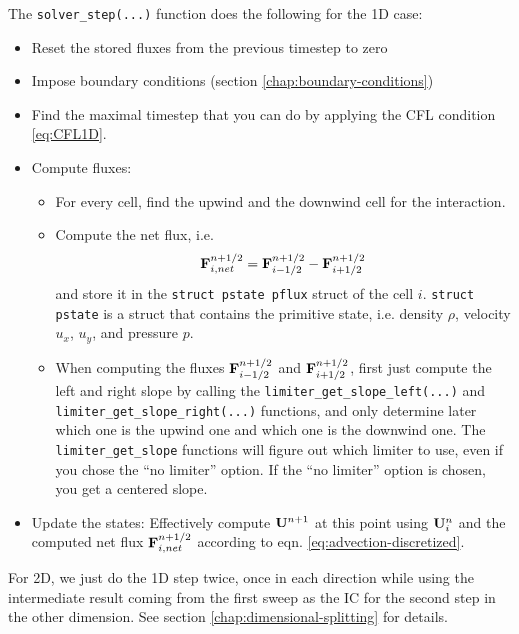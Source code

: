 The \verb|solver_step(...)| function does the following for the 1D case:
\begin{itemize}
	\item 	Reset the stored fluxes from the previous timestep to zero
	\item 	Impose boundary conditions (section \ref{chap:boundary-conditions})
	\item 	Find the maximal timestep that you can do by applying the CFL condition \ref{eq:CFL1D}.
	\item 	Compute fluxes:
	\begin{itemize}
		\item 	For every cell, find the upwind and the downwind cell for the interaction.
		\item 	Compute the net flux, i.e.
				\begin{equation}
				\mathbf{F}_{i, net}^{n+1/2} = \mathbf{F}_{i-1/2}^{n+1/2} - \mathbf{F}_{i+1/2}^{n+1/2}
				\end{equation}
				and store it in the \texttt{struct pstate pflux} struct of the cell $i$.
				\texttt{struct pstate} is a struct that contains the primitive state, i.e. density $\rho$, velocity $u_x$, $u_y$, and pressure $p$.
		\item 	When computing the fluxes $\mathbf{F}_{i-1/2}^{n+1/2}$ and $\mathbf{F}_{i+1/2}^{n+1/2}$, first just compute the left and right slope by calling the \texttt{limiter_get_slope_left(...)} and \texttt{limiter_get_slope_right(...)} functions, and only determine later which one is the upwind one and which one is the downwind one.
				The \verb|limiter_get_slope| functions will figure out which limiter to use, even if you chose the ``no limiter'' option.
				If the ``no limiter'' option is chosen, you get a centered slope.
	\end{itemize}
	\item 	Update the states: Effectively compute $\mathbf{U}^{n+1}$ at this point using $\mathbf{U}_i^n$ and the computed net flux $\mathbf{F}_{i, net}^{n+1/2}$ according to eqn. \ref{eq:advection-discretized}.
\end{itemize}



For 2D, we just do the 1D step twice, once in each direction while using the intermediate result coming from the first sweep as the IC for the second step in the other dimension.
See section \ref{chap:dimensional-splitting} for details.










